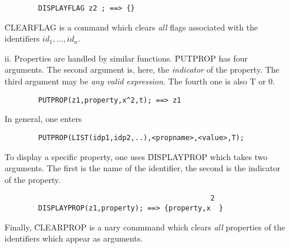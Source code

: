 \begin{itemize}
\begin{verbatim}
        DISPLAYFLAG z2 ; ==> {}
\end{verbatim}
\f{CLEARFLAG} is a command which clears {\em all} flags associated with
the identifiers $id_1, \ldots , id_n .$
\item[ii.] Properties are handled by similar functions.
\f{PUTPROP} has four arguments. The second argument is, here, the
{\em indicator} of the property. The third argument may be {\em any
valid expression}. The fourth one is also T or 0.
\begin{verbatim}
        PUTPROP(z1,property,x^2,t); ==> z1
\end{verbatim}
In general, one enters
\begin{verbatim}
        PUTPROP(LIST(idp1,idp2,..),<propname>,<value>,T);
\end{verbatim}
To display a specific property, one uses
\f{DISPLAYPROP} which takes two arguments. The first is the name of the
identifier, the second is the indicator of the property.
\begin{verbatim}
                                                 2
        DISPLAYPROP(z1,property); ==> {property,x  }
\end{verbatim}
Finally, \f{CLEARPROP} is a nary commmand which clears {\em all}
properties of the identifiers which appear as arguments.
\end{itemize}
